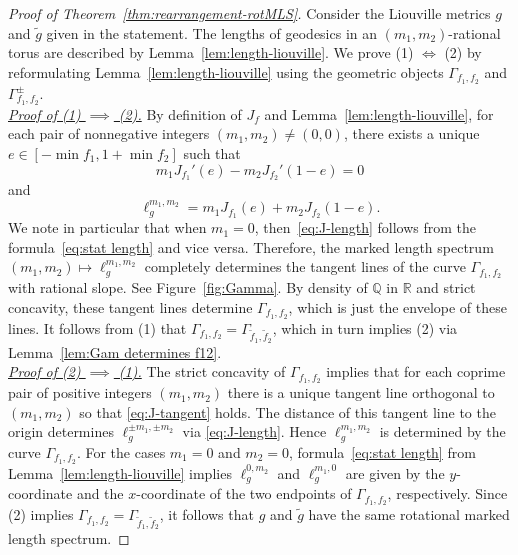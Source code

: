 \documentclass[11pt,letterpaper,oneside]{amsart}
\newcommand{\Q}{\mathbb{Q}}
\newcommand{\R}{\mathbb{R}}
\theoremstyle{definition}
\theoremstyle{remark}
\newcommand{\wt}{\widetilde}
\theoremstyle{definition}
\theoremstyle{remark}
\begin{document}
\begin{proof}[Proof of Theorem~\ref{thm:rearrangement-rotMLS}]
	Consider the Liouville metrics $g$ and $\wt g$ given in the statement.
	The lengths of geodesics in an $(m_1, m_2)$-rational torus are described by Lemma~\ref{lem:length-liouville}. 
	We prove (1) $\iff$ (2) by reformulating Lemma~\ref{lem:length-liouville} using the geometric objects $\Gamma_{f_1, f_2}$ and $\Gamma_{f_1, f_2}^\pm$.
\\[2mm]
	\noindent \underline{\textit{Proof of (1) $\implies$ (2).}}
	By definition of $J_f$ and Lemma~\ref{lem:length-liouville}, for each pair of nonnegative integers $(m_1, m_2) \neq (0,0)$, there exists a unique $e \in [-\min f_1, 1 + \min f_2]$ such that 
    \begin{equation}\label{eq:J-tangent}
        m_1 J_{f_1}'(e) - m_2 J_{f_2}'(1-e) = 0
    \end{equation}
    and
    \begin{equation}\label{eq:J-length}
        \ell_g^{m_1, m_2} = m_1 J_{f_1}(e) + m_2 J_{f_2}(1-e).
    \end{equation}
    We note in particular that when $m_1 = 0$, then~\eqref{eq:J-length} follows from the formula~\eqref{eq:stat length} and vice versa.
    Therefore, the marked length spectrum $(m_1, m_2) \mapsto \ell_g^{m_1, m_2}$ completely determines the tangent lines of the curve $\Gamma_{f_1, f_2}$ with rational slope. See Figure~\ref{fig:Gamma}.
    By density of $\Q$ in $\R$ and strict concavity, these tangent lines determine $\Gamma_{f_1, f_2}$, which is just the envelope of these lines.
	It follows from (1) that $\Gamma_{f_1, f_2} = \Gamma_{\wt f_1, \wt f_2}$, which in turn implies (2) via Lemma~\ref{lem:Gam determines f12}.
\\[2mm]
	\noindent \underline{\textit{Proof of (2) $\implies$ (1).}}
    The strict concavity of $\Gamma_{f_1, f_2}$ implies that for each coprime pair of positive integers $(m_1, m_2)$ there is a unique tangent line orthogonal to $(m_1, m_2)$ so that \eqref{eq:J-tangent} holds. 
	The distance of this tangent line to the origin determines $\ell_g^{\pm m_1, \pm m_2}$ via \eqref{eq:J-length}.
    Hence $\ell^{m_1, m_2}_g$ is determined by the curve $\Gamma_{f_1, f_2}$. 
    For the cases $m_1 = 0$ and $m_2 = 0$, formula~\eqref{eq:stat length} from Lemma~\ref{lem:length-liouville} implies $\ell^{0,m_2}_g$ and $\ell^{m_1, 0}_g$ are given by the $y$-coordinate and the $x$-coordinate of the two endpoints of $\Gamma_{f_1, f_2}$, respectively.
	Since (2) implies $\Gamma_{f_1, f_2} = \Gamma_{\wt f_1, \wt f_2}$, it follows that $g$ and $\wt g$ have the same rotational marked length spectrum.

\end{proof}
\end{document}
